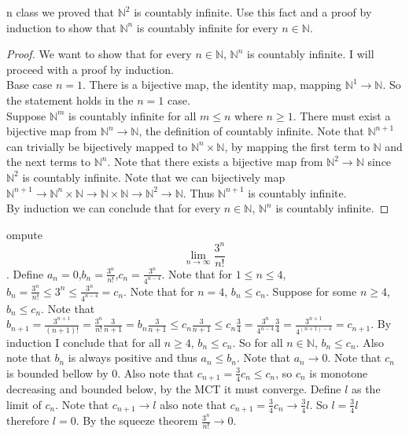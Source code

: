 \documentclass[12pt]{article}
\makeatletter
\theoremstyle{homework}
\newenvironment{exercise}[1]
{\def\@currentlabel{#1}\exercisecore}
{\endexercisecore}
\makeatother
\begin{document}
\begin{exercise}

In class we proved that $\mathbb{N}^2$ is countably infinite. Use this fact and a proof by induction to show that $\mathbb{N}^n$ is countably infinite for every $n \in \mathbb{N}$.
\end{exercise}
\begin{proof}
We want to show that for every $n \in \mathbb{N}$, $\mathbb{N}^n$ is countably infinite.  I will proceed with a proof by induction.\\
Base case $n=1$.  There is a bijective map, the identity map, mapping $\mathbb{N}^1\rightarrow\mathbb{N}$.  So the statement holds in the $n=1$ case.\\
Suppose $\mathbb{N}^m$ is countably infinite for all $m\leq n$ where $n\geq 1$.  There must exist a bijective map from $\mathbb{N}^n\rightarrow \mathbb{N}$, the definition of countably infinite.  Note that $\mathbb{N}^{n+1}$ can trivially be bijectively mapped to $\mathbb{N}^n\times \mathbb{N}$, by mapping the first term to $\mathbb{N}$ and the next terms to $\mathbb{N}^n$.  Note that there exists a bijective map from $\mathbb{N}^2\rightarrow \mathbb{N}$ since $\mathbb{N}^2$ is countably infinite.  Note that we can bijectively map $\mathbb{N}^{n+1}\rightarrow \mathbb{N}^n\times \mathbb{N}\rightarrow \mathbb{N}\times \mathbb{N}\rightarrow \mathbb{N}^2\rightarrow \mathbb{N}$.  Thus $\mathbb{N}^{n+1}$ is countably infinite.\\
By induction we can conclude that for every $n \in \mathbb{N}$, $\mathbb{N}^n$ is countably infinite.
\end{proof}
\begin{exercise}

Compute $$\lim_{n\rightarrow\infty}\frac{3^n}{n!}$$.
\end{exercise}
Define $a_n=0$,$b_n=\frac{3^n}{n!}$,$c_n=\frac{3^n}{4^{n-4}}$.  Note that for $1\leq n\leq 4$, $b_n=\frac{3^n}{n!}\leq 3^n\leq \frac{3^n}{4^{n-4}}=c_n$.  Note that for $n=4$, $b_n\leq c_n$.  Suppose for some $n\geq 4$, $b_n\leq c_n$.  Note that $b_{n+1}=\frac{3^{n+1}}{(n+1)!}=\frac{3^{n}}{n!}\frac{3}{n+1}=b_n\frac{3}{n+1}\leq c_n\frac{3}{n+1}\leq c_n\frac{3}{4}=\frac{3^n}{4^{n-4}}\frac{3}{4}=\frac{3^{n+1}}{4^{(n+1)-4}}=c_{n+1}$.  By induction I conclude that for all $n\geq 4$, $b_n\leq c_n$.  So for all $n\in \mathbb{N}$, $b_n\leq c_n$.  Also note that $b_n$ is always positive and thus $a_n\leq b_n$.  Note that $a_n\rightarrow 0$.  Note that $c_n$ is bounded bellow by $0$.  Also note that $c_{n+1}=\frac{3}{4}c_n\leq c_n$, so $c_n$ is monotone decreasing and bounded below, by the MCT it must converge.  Define $l$ as the limit of $c_n$.  Note that $c_{n+1}\rightarrow l$ also note that $c_{n+1}=\frac{3}{4}c_n\rightarrow \frac{3}{4}l$.  So $l=\frac{3}{4}l$ therefore $l=0$.  By the squeeze theorem $\frac{3^n}{n!}\rightarrow 0$.
\end{document}

